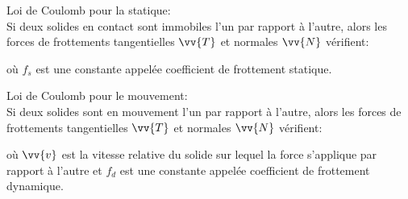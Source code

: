 ﻿\documentclass[a4paper]{article}
\begin{document}
\pagestyle{fancy}
\fancyhf{}
\setlength{\headheight}{15pt}

\begin{center}
	\large{}
\end{center}


Loi de Coulomb pour la statique:\\
Si deux solides en contact sont immobiles l'un par rapport à l'autre, alors les forces de frottements tangentielles \(\vv{T}\) et normales \(\vv{N}\) vérifient:
\begin{center}
\end{center}
où \(f_s\) est une constante appelée coefficient de frottement statique.

Loi de Coulomb pour le mouvement:\\
Si deux solides sont en mouvement l'un par rapport à l'autre, alors les forces de frottements tangentielles \(\vv{T}\) et normales \(\vv{N}\) vérifient:
\begin{center}
\end{center}
où \(\vv{v}\) est la vitesse relative du solide sur lequel la force s'applique par rapport à l'autre et \(f_d\) est une constante appelée coefficient de frottement dynamique.
\end{document}
